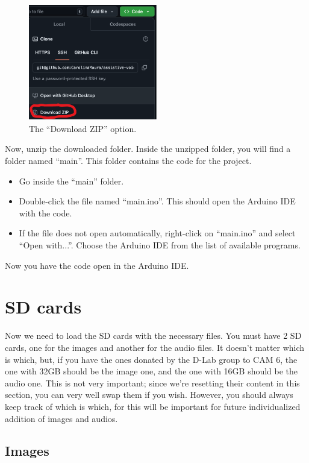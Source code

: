 \documentclass{article}
\begin{document}
\begin{figure}[h]
\centering
\includegraphics[width=0.5\textwidth]{../images/download_zip.png}
\caption{The ``Download ZIP'' option.}
\end{figure}

Now, unzip the downloaded folder. Inside the unzipped folder, you will find a folder named ``main''. This folder contains the code for the project.

\begin{itemize}
    \item Go inside the ``main'' folder.
    \item Double-click the file named ``main.ino''. This should open the Arduino IDE with the code.
    \item If the file does not open automatically, right-click on ``main.ino'' and select ``Open with...''. Choose the Arduino IDE from the list of available programs.
\end{itemize}

Now you have the code open in the Arduino IDE.

\newpage
\section{SD cards}\label{sec:sdcards}
Now we need to load the SD cards with the necessary files. You must have 2 SD cards, one for the images and another for the audio files. It doesn't matter which is which, but, if you have the ones donated by the D-Lab group to CAM 6, the one with 32GB should be the image one, and the one with 16GB should be the audio one. This is not very important; since we're resetting their content in this section, you can very well swap them if you wish. However, you should always keep track of which is which, for this will be important for future individualized addition of images and audios.

\subsection{Images}
\end{document}

